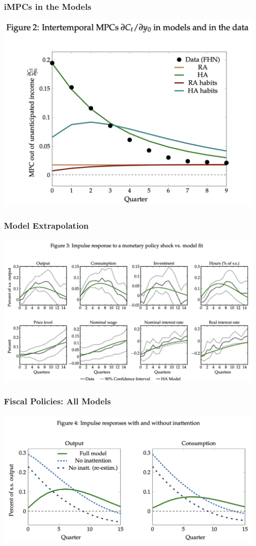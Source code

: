 \documentclass[english,xcolor=svgnames]{beamer}
\begin{document}
\begin{frame}
    \frametitle{iMPCs in the Models}
    \centering
    \includegraphics[scale=0.4]{figures/ARSFIG2.png}
\end{frame}


\begin{frame}
    \frametitle{Model Extrapolation}
    \centering
    \includegraphics[scale=0.3]{figures/ARSFIG3.png}
\end{frame}


\begin{frame}
    \frametitle{Fiscal Policies: All Models}
    \centering
    \includegraphics[scale=0.3]{figures/ARSFIG4.png}
\end{frame}
\end{document}
